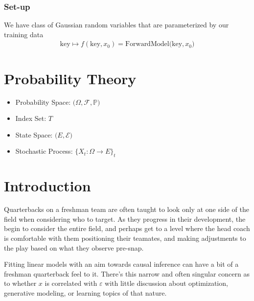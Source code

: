 \documentclass{article}
\begin{document}
\subsubsection{Set-up}
We have class of Gaussian random variables that are parameterized by our training data 
\begin{align*}
\textrm{key} \longmapsto f(\textrm{key}, x_0) = \textrm{ForwardModel(key}, x_0)
\end{align*}
\section{Probability Theory}
 
\begin{itemize}
    \item Probability Space: $\big(\Omega, \mathcal{F}, \mathbb{P}\big)$
    \item Index Set: $T$
    \item State Space: $\big(E, \mathcal{E}\big)$
    \item Stochastic Process: $\{X_t: \Omega \rightarrow E \}_t$
\end{itemize}
\newpage 
\section{Introduction}
Quarterbacks on a freshman team are often taught to look only at one side of the field when considering who to target. As they progress in their development, the begin to consider the entire field, and perhaps get to a level where the head coach is comfortable with them positioning their teamates, and making adjustments to the play based on what they observe pre-snap.\par 

Fitting linear models with an aim towards causal inference can have a bit of a freshman quarterback feel to it. There's this narrow and often singular concern as to whether $x$ is correlated with $\varepsilon$ with  little discussion about optimization, generative modeling, or learning topics of that nature.
\end{document}
